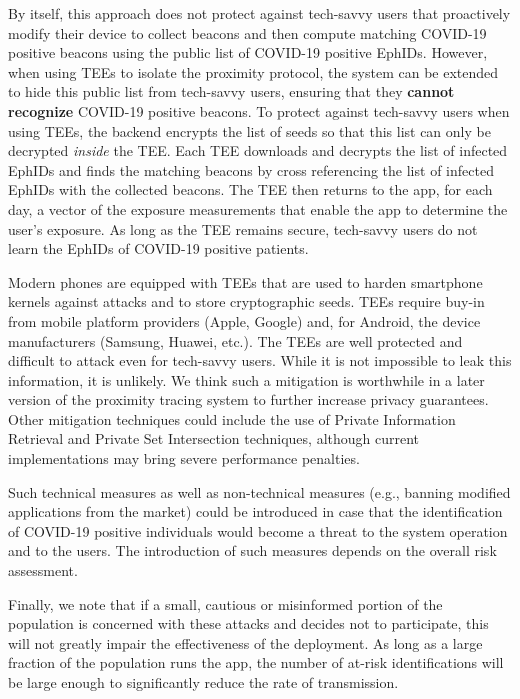 \documentclass{article}
\begin{document}
By itself, this approach does not protect against tech-savvy users that
proactively modify their device to collect beacons and then compute
matching COVID-19 positive beacons using the public list of COVID-19
positive EphIDs. However, when using TEEs to isolate the proximity
protocol, the system can be extended to hide this public list from
tech-savvy users, ensuring that they \textbf{cannot} \textbf{recognize}
COVID-19 positive beacons. To protect against tech-savvy users when
using TEEs, the backend encrypts the list of seeds so that this list can
only be decrypted \emph{inside} the TEE. Each TEE downloads and decrypts
the list of infected EphIDs and finds the matching beacons by cross
referencing the list of infected EphIDs with the collected beacons. The
TEE then returns to the app, for each day, a vector of the exposure
measurements that enable the app to determine the user's exposure. As
long as the TEE remains secure, tech-savvy users do not learn the EphIDs
of COVID-19 positive patients.

Modern phones are equipped with TEEs that are used to harden smartphone
kernels against attacks and to store cryptographic seeds. TEEs require
buy-in from mobile platform providers (Apple, Google) and, for Android,
the device manufacturers (Samsung, Huawei, etc.). The TEEs are well
protected and difficult to attack even for tech-savvy users. While it is
not impossible to leak this information, it is unlikely. We think such a
mitigation is worthwhile in a later version of the proximity tracing
system to further increase privacy guarantees. Other mitigation
techniques could include the use of Private Information Retrieval and
Private Set Intersection techniques, although current implementations
may bring severe performance penalties.

Such technical measures as well as non-technical measures (e.g., banning
modified applications from the market) could be introduced in case that
the identification of COVID-19 positive individuals would become a
threat to the system operation and to the users. The introduction of
such measures depends on the overall risk assessment.

Finally, we note that if a small, cautious or misinformed portion of the
population is concerned with these attacks and decides not to
participate, this will not greatly impair the effectiveness of the
deployment. As long as a large fraction of the population runs the app,
the number of at-risk identifications will be large enough to
significantly reduce the rate of transmission.
\end{document}
